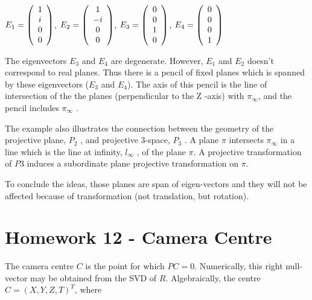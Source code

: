 \documentclass[]{article}
\begin{document}
\centerline {
	$E_1 = \left( {\begin{array}{*{20}c}
		1 \\
		i \\ 
		0 \\
		0   
		\end{array} } \right)$, $E_2 = \left( {\begin{array}{*{20}c}
		1 \\
		-i \\ 
		0 \\
		0   
		\end{array} } \right)$, 	$E_3 = \left( {\begin{array}{*{20}c}
		0 \\
		0 \\ 
		1 \\
		0   
		\end{array} } \right)$, 	$E_4 = \left( {\begin{array}{*{20}c}
		0 \\
		0 \\ 
		0 \\
		1   
		\end{array} } \right)$
}

\vspace{0.5em}

The eigenvectors $E_3$ and $E_4$ are degenerate. However, $E_1$ and $E_2$ doesn't correspond to real planes. Thus there is a pencil of fixed planes which is spanned by these eigenvectors ($E_3$ and $E_4$). The axis of this pencil is the line of intersection of the the planes (perpendicular to the Z -axis) with $\pi _ \infty$, and the pencil includes $\pi _ \infty$ .

The example also illustrates the connection between the geometry of the projective
plane, $P_2$ , and projective 3-space, $P_3$ . A plane $\pi$ intersects $\pi _ \infty$ in a line which is the line at infinity,  $l_ \infty$ , of the plane $\pi$. A projective transformation of $P3$ induces a subordinate plane projective transformation on $\pi$.

To conclude the ideas, those planes are span of eigen-vectors and they will not be affected because of transformation (not translation, but rotation).

\section{Homework 12 - Camera Centre }

The camera centre $C$ is the point for which $PC = 0$. Numerically, this right null-vector may be obtained from the SVD of $R$. Algebraically, the centre $C = (X, Y,Z,T)^T$, where 
\end{document}
